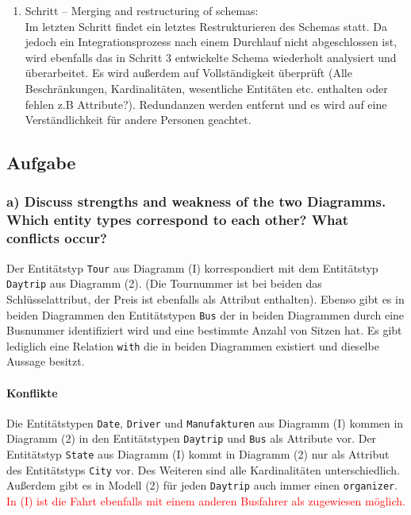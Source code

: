 \documentclass[11pt,a4paper,DIV=9]{scrartcl}
\newcounter{temp}
\newcommand{\aufgabe}[1]{
  \setcounter{temp}{\value{subsection}}
  \setcounter{subsection}{#1}
  \addtocounter{subsection}{-1}
  \subsection{Aufgabe}
  \setcounter{subsection}{\value{temp}}
}
\newcommand{\teil}[2][]{
  \subsubsection*{#2) #1}
}
\begin{document}
\begin{enumerate}
    \item Schritt -- Merging and restructuring of schemas: \\
    Im letzten Schritt findet ein letztes Restrukturieren des Schemas statt. Da jedoch ein Integrationsprozess nach einem Durchlauf nicht abgeschlossen ist, wird ebenfalls das in Schritt 3 entwickelte Schema wiederholt analysiert und \"uberarbeitet. Es wird au{\ss}erdem auf Vollst\"andigkeit \"uberpr\"uft (Alle Beschr\"ankungen, Kardinalit\"aten, wesentliche Entit\"aten etc. enthalten oder fehlen z.B Attribute?). Redundanzen werden entfernt und es wird auf eine Verst\"andlichkeit f\"ur andere Personen geachtet.
  \end{enumerate}

\aufgabe{3}
\teil[Discuss strengths and weakness of the two Diagramms. Which entity types correspond to each other? What conflicts occur?]{a}
  Der Entit\"atstyp \texttt{Tour} aus Diagramm (I) korrespondiert mit dem Entit\"atstyp \texttt{Daytrip} aus Diagramm (2). (Die Tournummer ist bei beiden das Schl\"usselattribut, der Preis ist ebenfalls als Attribut enthalten). Ebenso gibt es in beiden Diagrammen den Entit\"atstypen \texttt{Bus} der in beiden Diagrammen durch eine Busnummer identifiziert wird und eine bestimmte Anzahl von Sitzen hat. Es gibt lediglich eine Relation \texttt{with} die in beiden Diagrammen existiert und dieselbe Aussage besitzt.
  \paragraph{Konflikte} %
  \label{par:konflikte}
    Die Entit\"atstypen \texttt{Date}, \texttt{Driver} und \texttt{Manufakturen} aus Diagramm (I) kommen in Diagramm (2) in den Entit\"atstypen \texttt{Daytrip} und \texttt{Bus} als Attribute vor. Der Entit\"atstyp \texttt{State} aus Diagramm (I) kommt in Diagramm (2) nur als Attribut des Entit\"atstyps \texttt{City} vor. Des Weiteren sind alle Kardinalit\"aten unterschiedlich. Au{\ss}erdem gibt es in Modell (2) f\"ur jeden \texttt{Daytrip} auch immer einen \texttt{organizer}.
    \textcolor{red}{In (I) ist die Fahrt ebenfalls mit einem anderen Busfahrer als zugewiesen m\"oglich.}
\end{document}
